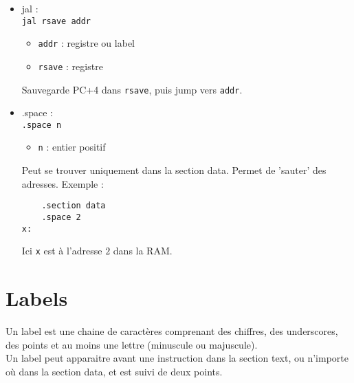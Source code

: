\documentclass[a4paper]{article}
\begin{document}
\begin{itemize}
        \item jal :\\
        \texttt{jal rsave addr}
        \begin{itemize}
            \item \texttt{addr} : registre ou label
            \item \texttt{rsave} : registre
        \end{itemize}
        Sauvegarde PC+4 dans \texttt{rsave}, puis jump vers \texttt{addr}.

        \item .space :\\
        \texttt{.space n}
        \begin{itemize}
            \item \texttt{n} : entier positif
        \end{itemize}
        Peut se trouver uniquement dans la section data. Permet de 'sauter' des adresses. 
        Exemple :
\begin{lstlisting}
    .section data
    .space 2
x:  
\end{lstlisting}
    Ici \texttt{x} est à l'adresse $2$ dans la RAM.
        
    \end{itemize}

    \section{Labels}
    Un label est une chaine de caractères comprenant des chiffres, 
    des underscores, des points et au moins une lettre (minuscule ou majuscule).\\
    Un label peut apparaitre avant une instruction dans la section text,
    ou n'importe où dans la section data, et est suivi de deux points.
\end{document}
